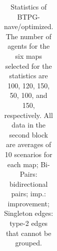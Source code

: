 \documentclass[letterpaper]{article} %
\theoremstyle{definition}
\begin{document}
\begin{table}[th!]
{\begin{tabular}{|c|c|c|c|c|c|c|c|c|c|c|c|c|}
    \end{tabular}}

   \caption{Statistics of BTPG-nave/optimized. The number of agents for the six maps selected for the statistics are 100, 120, 150, 50, 100, and 150, respectively. All data in the second block are averages of 10 scenarios for each map; Bi-Pairs: bidirectional pairs; imp.: improvement; Singleton edges: type-2 edges that cannot be grouped. %
   }
   \label{tab:Statistics of BTPG-naive}
 \end{table}
\end{document}
